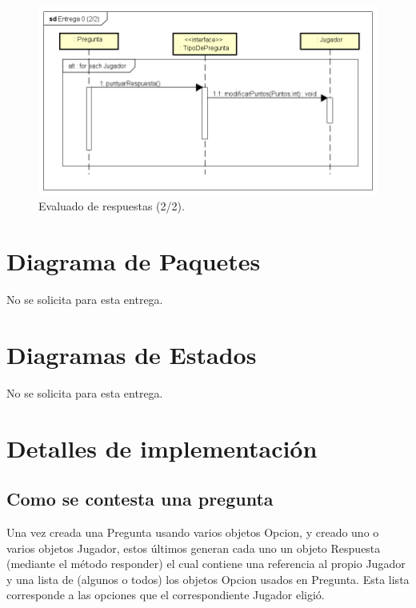 \documentclass[titlepage,a4paper]{article}
\begin{document}
\begin{figure}[H]
\centering
\includegraphics[width=1\textwidth]{img/UMLSeq4.png}
\caption{\label{fig:class01}Evaluado de respuestas (2/2).}
\end{figure}

\section{Diagrama de Paquetes}

No se solicita para esta entrega.

\section{Diagramas de Estados}

No se solicita para esta entrega.

\section{Detalles de implementación}

\subsection{Como se contesta una pregunta}

Una vez creada una Pregunta usando varios objetos Opcion, y creado uno o varios objetos Jugador, estos últimos generan cada uno un objeto Respuesta (mediante el método responder) el cual contiene una referencia al propio Jugador y una lista de (algunos o todos) los objetos Opcion usados en Pregunta. Esta lista corresponde a las opciones que el correspondiente Jugador eligió.
\end{document}
